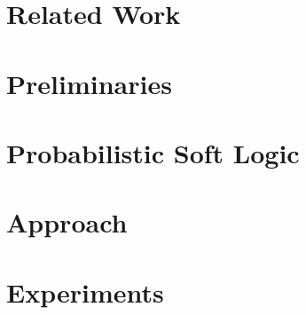 \documentclass{sig-alternate}
\begin{document}
\section{Related Work}


\section{Preliminaries}


\section{Probabilistic Soft Logic}

\label{section:PSL}

\section{Approach}


\section{Experiments}



\end{document}
